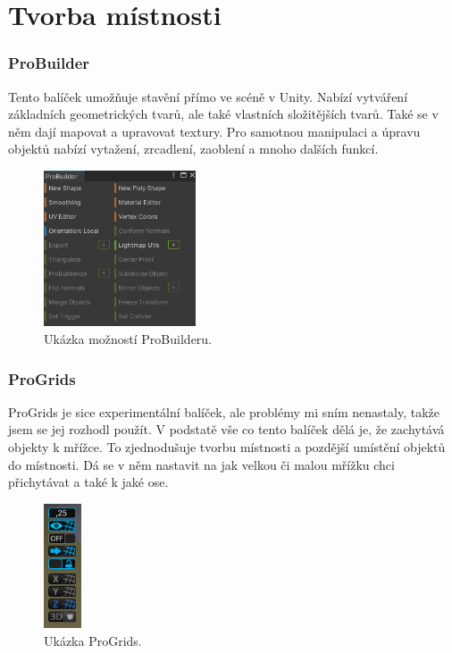\documentclass[12pt, a4paper,
twoside,        %
openright
]{report}
\begin{document}
\newpage

\section {Tvorba místnosti}
\label{sec:tvorba_mistnosti}
\subsubsection{ProBuilder}
Tento balíček umožňuje stavění přímo ve scéně v Unity. Nabízí  vytváření základních geometrických tvarů, ale také vlastních složitějších tvarů. Také se v něm dají mapovat a upravovat textury. Pro samotnou manipulaci a úpravu objektů nabízí vytažení, zrcadlení, zaoblení a mnoho dalších funkcí.

\begin{figure}[H]
	\centering
	\includegraphics[width=0.4\textwidth]{image/proBuilder.png}
	\caption{Ukázka možností ProBuilderu.}
	\label{fig:ProBuilder}
\end{figure}

\subsubsection{ProGrids}
ProGrids je sice experimentální balíček, ale problémy mi sním nenastaly, takže jsem se jej rozhodl použít. V podstatě vše co tento balíček dělá je, že zachytává objekty k mřížce. To zjednodušuje tvorbu místnosti a pozdější umístění objektů do místnosti. Dá se v něm nastavit na jak velkou či malou mřížku chci přichytávat a také k jaké ose.

\begin{figure}[H]
	\centering
	\includegraphics[width=0.1\textwidth]{image/proGrids.png}
	\caption{Ukázka ProGrids.}
	\label{fig:ProGrids}
\end{figure}
\end{document}
